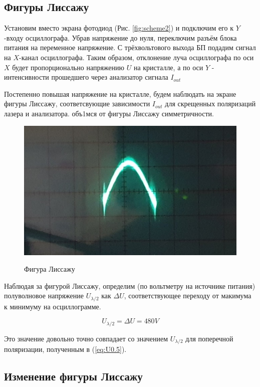 \documentclass{article}
\begin{document}
\subsection{Фигуры Лиссажу} \label{sec:Liss}
Установим вместо экрана фотодиод (Рис. \ref{fig:scheme2}) и подключим его к \(Y\)-входу осциллографа.
Убрав напряжение до нуля, переключим разъём блока питания на переменное напряжение. С трёхвольтового
выхода БП подадим сигнал на  \(X\)-канал осциллографа. Таким образом, отклонение луча осциллографа по
оси \(X\) будет пропорционально напряжению \(U\) на кристалле, а по оси \(Y\) - интенсивности прошедшего
через анализатор сигнала \(I_{out}\)

Постепенно повышая напряжение на кристалле, будем наблюдать на экране фигуры Лиссажу, соответсвующие
зависимости \(I_{out}\) для скрещенных поляризаций лазера и анализатора. объ1мся от фигуры Лиссажу
симметричности.

\begin{figure}[H]
  \centering
  \includegraphics[width=\textwidth]{L1.jpg}\label{fig:L}
  \caption{Фигура Лиссажу}
\end{figure}

Наблюдая за фигурой Лиссажу, определим (по вольтметру на источнике питания) полуволновое напряжение 
\(U_{\lambda/2}\) как \(\Delta U\), соответствующее переходу от макимума к минимуму на осциллограмме.

\[ U_{\lambda/2} = \Delta U = 480 V\]

Это значение довольно точно совпадает со значением \(U_{\lambda/2}\) для поперечной поляризации, полученным
в (\ref{eq:U0.5}).

\subsection{Изменение фигуры Лиссажу}
\end{document}
